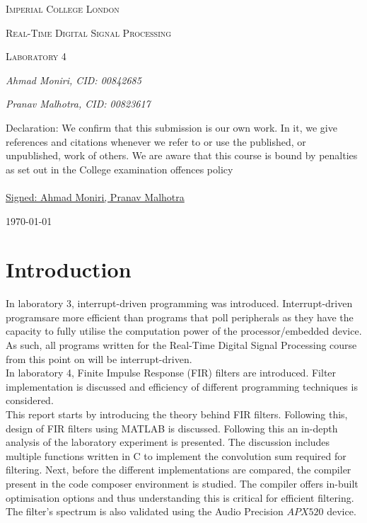 \documentclass{article}
\begin{document}
\begin{titlepage}
	\centering
	{\scshape\LARGE Imperial College London \par}
	\vspace{2cm}
	{\scshape\Large Real-Time Digital Signal Processing \par}
	\vspace{1cm}
	{\scshape\Large Laboratory 4\par}
	\vspace{2.5cm}
	{\Large\itshape Ahmad Moniri, CID: 00842685 \par}
	\vspace{1cm}
	{\Large\itshape Pranav Malhotra, CID: 00823617 \par}
	\vfill
	\begin{tcolorbox}
    \centering
    Declaration: We confirm that this submission is our own work. In it, we give references and citations whenever we refer to or use the published, or
    unpublished, work of others. We are aware that this course is bound by
    penalties as set out in the College examination offences policy \\~\\
    \underline{Signed: Ahmad Moniri, Pranav Malhotra}
    \end{tcolorbox}
	{\large \today\par}
\end{titlepage}

\newpage
\tableofcontents

\newpage
\section{Introduction}
In laboratory 3, interrupt-driven programming was introduced. Interrupt-driven programsare more efficient than programs that poll peripherals as they have the capacity to fully utilise the computation power of the processor/embedded device. As such, all programs written for the Real-Time Digital Signal Processing course from this point on will be interrupt-driven.\\ 

In laboratory 4, Finite Impulse Response (FIR) filters are introduced. Filter implementation is discussed and efficiency of different programming techniques is considered.\\

This report starts by introducing the theory behind FIR filters. Following this, design of FIR filters using MATLAB is discussed. Following this an in-depth analysis of the laboratory experiment is presented. The discussion includes multiple functions written in C to implement the convolution sum required for filtering. Next, before the different implementations are compared, the compiler present in the code composer environment is studied. The compiler offers in-built optimisation options and thus understanding this is critical for efficient filtering. The filter's spectrum is also validated using the Audio Precision $APX520$ device.
\end{document}
